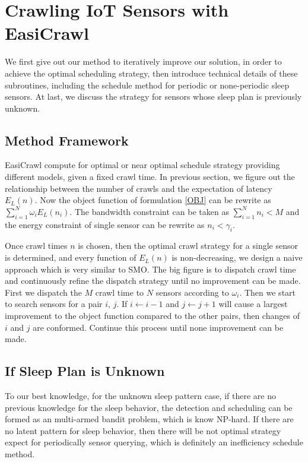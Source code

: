 \documentclass[conference]{IEEEtran}
\begin{document}
\section{Crawling IoT Sensors with EasiCrawl}

We first give out our method to iteratively improve our solution, in order to achieve the optimal scheduling strategy, then introduce technical details of these subroutines, including the schedule method for periodic or none-periodic sleep sensors. At last, we discuss the strategy for sensors whose sleep plan is previously unknown.

\subsection{Method Framework}
EasiCrawl compute for optimal or near optimal schedule strategy providing different models, given a fixed crawl time.
In previous section, we figure out the relationship between the number of crawls and the expectation of latency $E_L(n)$. 
Now the object function of formulation \ref{OBJ} can be rewrite as $\sum_{i=1}^{N} \omega_i E_L(n_i)$. The bandwidth constraint can be taken as $\sum_{i=1}^{N} n_i < M$ and the energy constraint of single sensor can be rewrite as $n_i<\gamma_i$.


Once crawl times $n$ is chosen, then the optimal crawl strategy for a single sensor is determined, and every function of $E_L(n)$ is non-decreasing,  we design a naive approach which is very similar to SMO\cite{Platt1998}. 
The big figure is to dispatch crawl time and continuously refine the dispatch strategy until no improvement can be made.
First we dispatch the $M$ crawl time to $N$ sensors according to $\omega_i$. Then we start to search sensors for a pair $i$, $j$. If $i\gets i-1$ and $j\gets j+1$ will cause a largest improvement to the object function compared to the other pairs, then changes of $i$ and $j$ are conformed. Continue this process until none improvement can be made.

\subsection{If Sleep Plan is Unknown}
To our best knowledge, for the unknown sleep pattern case, if there are no previous knowledge for the sleep behavior, the detection and scheduling can be formed as an multi-armed bandit problem, which is know NP-hard. If there are no latent pattern for sleep behavior, then there will be not optimal strategy expect for periodically sensor querying, which is definitely an inefficiency schedule method. 
\end{document}
